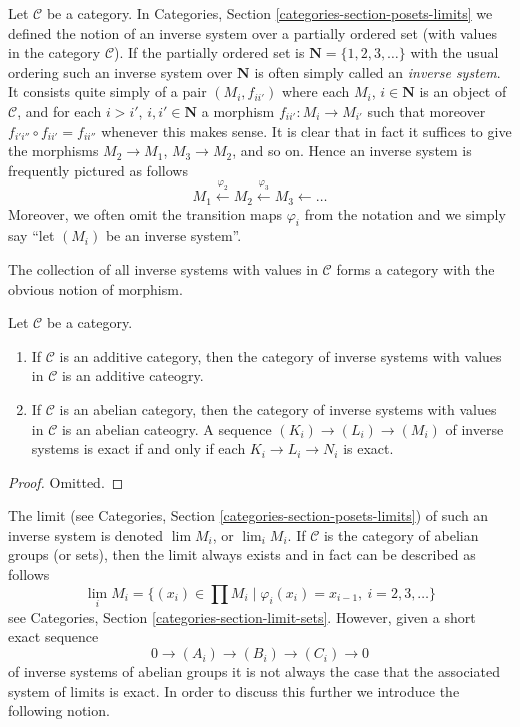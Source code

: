 \noindent
Let $\mathcal{C}$ be a category.
In Categories, Section \ref{categories-section-posets-limits}
we defined the notion of an inverse system over a partially ordered set
(with values in the category $\mathcal{C}$).
If the partially ordered set is $\mathbf{N} = \{1, 2, 3, \ldots\}$
with the usual ordering such an inverse system over $\mathbf{N}$
is often simply called an {\it inverse system}. It consists quite simply
of a pair $(M_i, f_{ii'})$ where each $M_i$, $i \in \mathbf{N}$
is an object of $\mathcal{C}$, and for each $i > i'$, $i, i' \in \mathbf{N}$
a morphism $f_{ii'} : M_i \to M_{i'}$ such that moreover
$f_{i'i''} \circ f_{ii'} = f_{ii''}$ whenever this makes sense.
It is clear that in fact it suffices to give the morphisms
$M_2 \to M_1$, $M_3 \to M_2$, and so on. Hence an inverse system
is frequently pictured as follows
$$
M_1 \xleftarrow{\varphi_2} M_2 \xleftarrow{\varphi_3} M_3 \leftarrow \ldots
$$
Moreover, we often omit the transition maps $\varphi_i$ from the notation
and we simply say ``let $(M_i)$ be an inverse system''.

\medskip\noindent
The collection of all inverse systems with values in
$\mathcal{C}$ forms a category with the obvious notion of morphism.

\begin{lemma}
\label{lemma-inverse-systems-abelian}
Let $\mathcal{C}$ be a category.
\begin{enumerate}
\item If $\mathcal{C}$ is an additive category, then the category
of inverse systems with values in $\mathcal{C}$ is an additive cateogry.
\item If $\mathcal{C}$ is an abelian category, then the category
of inverse systems with values in $\mathcal{C}$ is an abelian cateogry.
A sequence $(K_i) \to (L_i) \to (M_i)$ of inverse systems
is exact if and only if each $K_i \to L_i \to N_i$ is exact.
\end{enumerate}
\end{lemma}

\begin{proof}
Omitted.
\end{proof}

\noindent
The limit (see Categories, Section \ref{categories-section-posets-limits})
of such an inverse system is denoted $\lim M_i$, or $\lim_i M_i$.
If $\mathcal{C}$ is the category of abelian groups (or sets), then the limit
always exists and in fact can be described as follows
$$
\lim_i M_i
=
\{(x_i) \in \prod M_i \mid \varphi_i(x_i) = x_{i - 1}, \ i = 2, 3, \ldots\}
$$
see Categories, Section \ref{categories-section-limit-sets}.
However, given a short exact sequence
$$
0 \to (A_i) \to (B_i) \to (C_i) \to 0
$$
of inverse systems of abelian groups it is not always the case
that the associated system of limits is exact. In order to discuss
this further we introduce the following notion.

